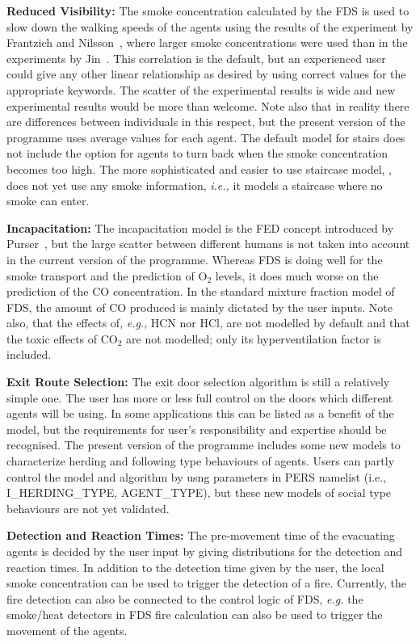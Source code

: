 \documentclass[12pt,a4paper,final,twoside]{stylevk}
\begin{document}
\textbf{Reduced Visibility:} The smoke concentration calculated by the
FDS is used to slow down the walking speeds of the agents using the
results of the experiment by Frantzich and Nilsson~\cite{Frantzich03},
where larger smoke concentrations were used than in the experiments by
Jin~\cite{Jin78}.  This correlation is the default, but an experienced
user could give any other linear relationship as desired by using
correct values for the appropriate keywords.  The scatter of the
experimental results is wide and new experimental results would be
more than welcome.  Note also that in reality there are differences
between individuals in this respect, but the present version of the
programme uses average values for each agent.  The default model for
stairs does not include the option for agents to turn back when the
smoke concentration becomes too high.  The more sophisticated and
easier to use staircase model, , does not yet use any
smoke information, \emph{i.e.,} it models a staircase where no smoke
can enter.


\textbf{Incapacitation:} The incapacitation model is the FED concept
introduced by Purser~\cite{Purser03}, but the large scatter between
different humans is not taken into account in the current version of
the programme.  Whereas FDS is doing well for the smoke transport and
the prediction of O${}_2$ levels, it does much worse on the prediction
of the CO concentration.  In the standard mixture fraction model of
FDS, the amount of CO produced is mainly dictated by the user inputs.
Note also, that the effects of, \emph{e.g.}, HCN nor HCl, are not
modelled by default and that the toxic effects of CO${}_2$ are not
modelled; only its hyperventilation factor is included.


\textbf{Exit Route Selection:} The exit door selection algorithm is
still a relatively simple one.  The user has more or less full control
on the doors which different agents will be using.  In some
applications this can be listed as a benefit of the model, but the
requirements for user's responsibility and expertise should be
recognised.  The present version of the programme includes some new models to characterize herding and following type behaviours of agents.  Users can partly control the model and algorithm by usng parameters in PERS namelist (i.e., I_HERDING_TYPE, AGENT_TYPE), but these new models of social type behaviours are not yet validated.


\textbf{Detection and Reaction Times:} The pre-movement time of the
evacuating agents is decided by the user input by giving distributions
for the detection and reaction times.  In addition to the detection
time given by the user, the local smoke concentration can be used to
trigger the detection of a fire.  Currently, the fire detection can
also be connected to the control logic of FDS, \emph{e.g.}  the
smoke/heat detectors in FDS fire calculation can also be used to
trigger the movement of the agents.
\end{document}
